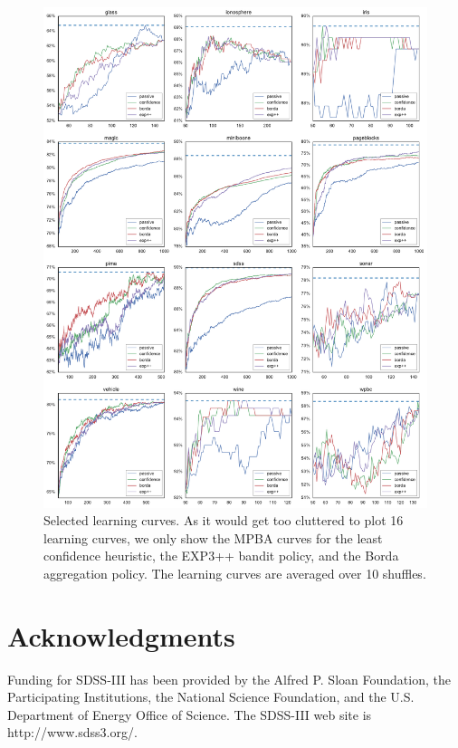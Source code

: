 \documentclass[fleqn,10pt,lineno]{wlpeerj} %
\begin{document}
\begin{figure}[tbp]
	\centering
	\includegraphics[width=\textwidth]{figures/learning_curves}
	\caption[Selected learning curves]{Selected learning curves. As it would
	get too cluttered to plot 16 learning curves, we only show the MPBA curves
	for the least confidence heuristic, the EXP3++ bandit policy, and the Borda
	aggregation policy. The learning curves are averaged over 10 shuffles.}
	\label{fig:learning_curves}
\end{figure}


\section*{Acknowledgments}

Funding for SDSS-III has been provided by the Alfred P. Sloan Foundation, the
Participating Institutions, the National Science Foundation, and the U.S.
Department of Energy Office of Science. The SDSS-III web site is
http://www.sdss3.org/.
\end{document}
